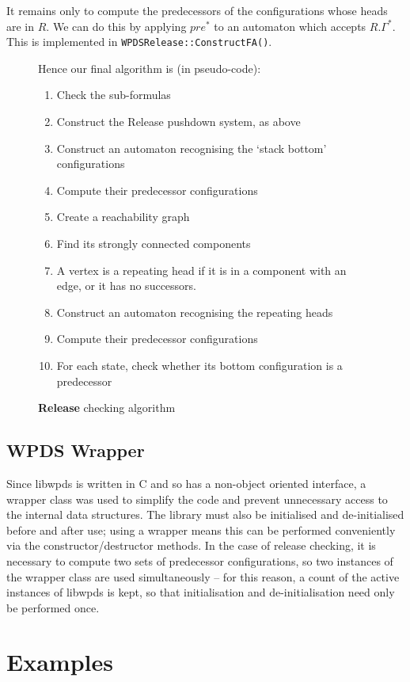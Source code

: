 \documentclass[11pt]{article}
\theoremstyle{definition}
\begin{document}
It remains only to compute the predecessors of the configurations whose heads
are in $R$. We can do this by applying $\textit{pre}^*$ to an automaton which
accepts $R.\Gamma^*$. This is implemented in \texttt{WPDSRelease::ConstructFA()}.

\begin{figure}[h!] %
\caption{\textbf{Release} checking algorithm}
Hence our final algorithm is (in pseudo-code):
\begin{enumerate}
\item{Check the sub-formulas}
\item{Construct the Release pushdown system, as above}
\item{Construct an automaton recognising the `stack bottom' configurations}
\item{Compute their predecessor configurations}
\item{Create a reachability graph}
\item{Find its strongly connected components}
\item{A vertex is a repeating head if it is in a component with an edge, or it has no successors.}
\item{Construct an automaton recognising the repeating heads}
\item{Compute their predecessor configurations}
\item{For each state, check whether its bottom configuration is a predecessor}
\end{enumerate}
\end{figure}

\subsection{WPDS Wrapper}

Since libwpds is written in C and so has a non-object oriented interface, a
wrapper class was used to simplify the code and prevent unnecessary access to
the internal data structures. The library must also be initialised and
de-initialised before and after use; using a wrapper means this can be
performed conveniently via the constructor/destructor methods. In the case of
release checking, it is necessary to compute two sets of predecessor
configurations, so two instances of the wrapper class are used simultaneously
-- for this reason, a count of the active instances of libwpds is kept, so that
initialisation and de-initialisation need only be performed once.

\section{Examples}
\end{document}
